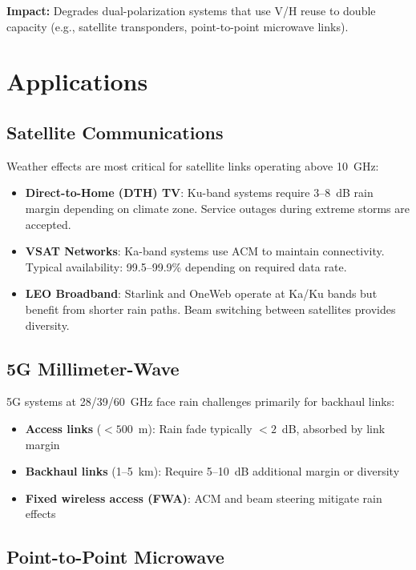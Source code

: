 \textbf{Impact:} Degrades dual-polarization systems that use V/H reuse to double capacity (e.g., satellite transponders, point-to-point microwave links).

\section{Applications}

\subsection{Satellite Communications}

Weather effects are most critical for satellite links operating above 10~GHz:

\begin{itemize}
\item \textbf{Direct-to-Home (DTH) TV}: Ku-band systems require 3--8~dB rain margin depending on climate zone. Service outages during extreme storms are accepted.

\item \textbf{VSAT Networks}: Ka-band systems use ACM to maintain connectivity. Typical availability: 99.5--99.9\% depending on required data rate.

\item \textbf{LEO Broadband}: Starlink and OneWeb operate at Ka/Ku bands but benefit from shorter rain paths. Beam switching between satellites provides diversity.
\end{itemize}

\subsection{5G Millimeter-Wave}

5G systems at 28/39/60~GHz face rain challenges primarily for backhaul links:

\begin{itemize}
\item \textbf{Access links} ($< 500$~m): Rain fade typically $< 2$~dB, absorbed by link margin
\item \textbf{Backhaul links} (1--5~km): Require 5--10~dB additional margin or diversity
\item \textbf{Fixed wireless access (FWA)}: ACM and beam steering mitigate rain effects
\end{itemize}

\subsection{Point-to-Point Microwave}

